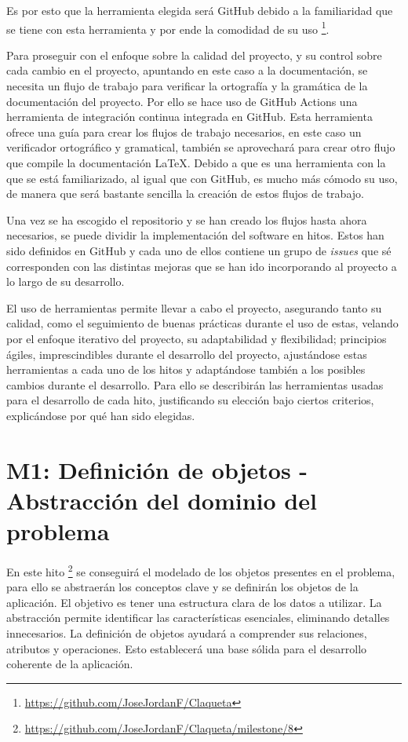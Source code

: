 Es por esto que la herramienta elegida será GitHub debido a la familiaridad que se tiene con esta herramienta y 
por ende la comodidad de su uso \footnote{\url{https://github.com/JoseJordanF/Claqueta}}.

Para proseguir con el enfoque sobre la calidad del proyecto, y su control sobre cada cambio en el proyecto, apuntando 
en este caso a la documentación, se necesita un flujo de trabajo para verificar la ortografía y la gramática de la 
documentación del proyecto. Por ello se hace uso de GitHub Actions una herramienta de integración continua integrada 
en GitHub. Esta herramienta ofrece una guía para crear los flujos de trabajo necesarios, en este caso un verificador 
ortográfico y gramatical, también se aprovechará para crear otro flujo que compile la documentación LaTeX. Debido a 
que es una herramienta con la que se está familiarizado, al igual que con GitHub, es mucho más cómodo su uso, de 
manera que será bastante sencilla la creación de estos flujos de trabajo. 

Una vez se ha escogido el repositorio y se han creado los flujos hasta ahora necesarios, se puede dividir 
la implementación del software en hitos. Estos han sido definidos en GitHub y cada uno de ellos contiene un grupo de 
\textit{issues} que sé corresponden con las distintas mejoras que se han ido incorporando al proyecto a lo largo
de su desarrollo.

El uso de herramientas permite llevar a cabo el proyecto, asegurando tanto su calidad, como el seguimiento de buenas
prácticas durante el uso de estas, velando por el enfoque iterativo del proyecto, su adaptabilidad y flexibilidad;
principios ágiles, imprescindibles durante el desarrollo del proyecto, ajustándose estas herramientas a cada
uno de los hitos y adaptándose también a los posibles cambios durante el desarrollo. Para ello se describirán las
herramientas usadas para el desarrollo de cada hito, justificando su elección bajo ciertos criterios, explicándose 
por qué han sido elegidas.

\section{M1: Definición de objetos - Abstracción del dominio del problema}

En este hito \footnote{\url{https://github.com/JoseJordanF/Claqueta/milestone/8}} se conseguirá el 
modelado de los objetos presentes en el problema, para ello se abstraerán 
los conceptos clave y se definirán los objetos de la aplicación. El objetivo es tener una estructura 
clara de los datos a utilizar. La abstracción permite identificar las características 
esenciales, eliminando detalles innecesarios. La definición de objetos ayudará a comprender sus 
relaciones, atributos y operaciones. Esto establecerá una base sólida para el desarrollo coherente 
de la aplicación.

